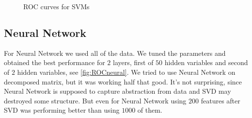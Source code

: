 \documentclass[]{article}
\begin{document}
  \begin{figure}[h]
    \center
    \caption{ROC curves for SVMs}
  \end{figure}

\subsection{Neural Network}
For Neural Network we used all of the data. We tuned the parameters and obtained the best performance for $2$ layers, first of $50$ hidden variables and second of $2$ hidden variables, see \ref{fig:ROCneural}. We tried to use Neural Network on decomposed matrix, but it was working half that good. It's not surprising, since Neural Network is supposed to capture abstraction from data and SVD may destroyed some structure. But even for Neural Network using $200$ features after SVD was performing better than using $1000$ of them.
\end{document}
